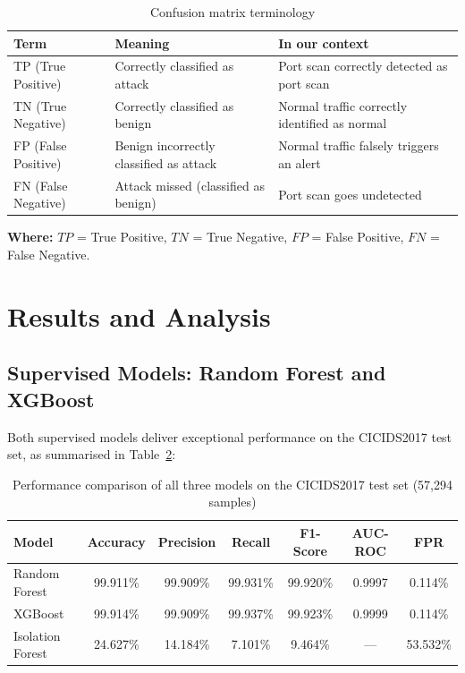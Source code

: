 \begin{table}[H]
\centering
\caption{Confusion matrix terminology}
\label{tab:cm_terms}
\begin{tabular}{llp{7cm}}
\toprule
\textbf{Term} & \textbf{Meaning} & \textbf{In our context} \\
\midrule
TP (True Positive) & Correctly classified as attack & Port scan correctly detected as port scan \\
TN (True Negative) & Correctly classified as benign & Normal traffic correctly identified as normal \\
FP (False Positive) & Benign incorrectly classified as attack & Normal traffic falsely triggers an alert \\
FN (False Negative) & Attack missed (classified as benign) & Port scan goes undetected \\
\bottomrule
\end{tabular}
\end{table}

\noindent\textbf{Where:} $TP$ = True Positive, $TN$ = True Negative, $FP$ = False Positive, $FN$ = False Negative.

\section{Results and Analysis}

\subsection{Supervised Models: Random Forest and XGBoost}

Both supervised models deliver exceptional performance on the CICIDS2017 test set, as summarised in Table~\ref{tab:results}:

\begin{table}[H]
\centering
\caption{Performance comparison of all three models on the CICIDS2017 test set (57,294 samples)}
\label{tab:results}
\begin{tabular}{lcccccc}
\toprule
\textbf{Model} & \textbf{Accuracy} & \textbf{Precision} & \textbf{Recall} & \textbf{F1-Score} & \textbf{AUC-ROC} & \textbf{FPR} \\
\midrule
Random Forest & 99.911\% & 99.909\% & 99.931\% & 99.920\% & 0.9997 & 0.114\% \\
XGBoost & 99.914\% & 99.909\% & 99.937\% & 99.923\% & 0.9999 & 0.114\% \\
Isolation Forest & 24.627\% & 14.184\% & 7.101\% & 9.464\% & --- & 53.532\% \\
\bottomrule
\end{tabular}
\end{table}

